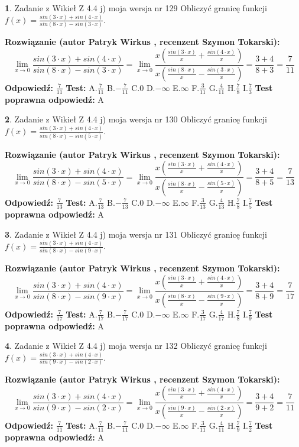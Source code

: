 \documentclass[12pt, a4paper]{article}
\theoremstyle{definition} %
\newtheorem{zad}{}
\newcommand{\zadStart}[1]{\begin{zad}#1\newline}
\newcommand{\zadStop}{\end{zad}}
\newcommand{\rozwStart}[2]{\noindent \textbf{Rozwiązanie (autor #1 , recenzent #2): }\newline}
\newcommand{\rozwStop}{\newline}
\newcommand{\odpStart}{\noindent \textbf{Odpowiedź:}\newline}
\newcommand{\odpStop}{\newline}
\newcommand{\testStart}{\noindent \textbf{Test:}\newline}
\newcommand{\testStop}{\newline}
\newcommand{\kluczStart}{\noindent \textbf{Test poprawna odpowiedź:}\newline}
\newcommand{\kluczStop}{\newline}
\begin{document}
\zadStart{Zadanie z Wikieł Z 4.4 j) moja wersja nr 129}
Obliczyć granicę funkcji $f(x)=\frac{sin(3\cdot x) +sin(4\cdot x)}{sin(8\cdot x) -sin(3\cdot x)}$.
\zadStop
\rozwStart{Patryk Wirkus}{Szymon Tokarski}
$$\lim\limits_{x\to 0}\frac{sin(3\cdot x) +sin(4\cdot x)}{sin(8\cdot x) -sin(3\cdot x)}=\lim\limits_{x\to 0}\frac{x(\frac{sin(3\cdot x)}{x}+\frac{sin(4\cdot x)}{x})}{x(\frac{sin(8\cdot x)}{x}-\frac{sin(3\cdot x)}{x})}=\frac{3+4}{8+3} = \frac{7}{11}$$
\rozwStop
\odpStart
$\frac{7}{11}$
\odpStop
\testStart
A.$\frac{7}{11}$
B.$-\frac{7}{11}$
C.$0$
D.$-\infty$
E.$\infty$
F.$\frac{3}{11}$
G.$\frac{4}{11}$
H.$\frac{7}{8}$
I.$\frac{7}{3}$
\testStop
\kluczStart
A
\kluczStop



\zadStart{Zadanie z Wikieł Z 4.4 j) moja wersja nr 130}
Obliczyć granicę funkcji $f(x)=\frac{sin(3\cdot x) +sin(4\cdot x)}{sin(8\cdot x) -sin(5\cdot x)}$.
\zadStop
\rozwStart{Patryk Wirkus}{Szymon Tokarski}
$$\lim\limits_{x\to 0}\frac{sin(3\cdot x) +sin(4\cdot x)}{sin(8\cdot x) -sin(5\cdot x)}=\lim\limits_{x\to 0}\frac{x(\frac{sin(3\cdot x)}{x}+\frac{sin(4\cdot x)}{x})}{x(\frac{sin(8\cdot x)}{x}-\frac{sin(5\cdot x)}{x})}=\frac{3+4}{8+5} = \frac{7}{13}$$
\rozwStop
\odpStart
$\frac{7}{13}$
\odpStop
\testStart
A.$\frac{7}{13}$
B.$-\frac{7}{13}$
C.$0$
D.$-\infty$
E.$\infty$
F.$\frac{3}{13}$
G.$\frac{4}{13}$
H.$\frac{7}{8}$
I.$\frac{7}{5}$
\testStop
\kluczStart
A
\kluczStop



\zadStart{Zadanie z Wikieł Z 4.4 j) moja wersja nr 131}
Obliczyć granicę funkcji $f(x)=\frac{sin(3\cdot x) +sin(4\cdot x)}{sin(8\cdot x) -sin(9\cdot x)}$.
\zadStop
\rozwStart{Patryk Wirkus}{Szymon Tokarski}
$$\lim\limits_{x\to 0}\frac{sin(3\cdot x) +sin(4\cdot x)}{sin(8\cdot x) -sin(9\cdot x)}=\lim\limits_{x\to 0}\frac{x(\frac{sin(3\cdot x)}{x}+\frac{sin(4\cdot x)}{x})}{x(\frac{sin(8\cdot x)}{x}-\frac{sin(9\cdot x)}{x})}=\frac{3+4}{8+9} = \frac{7}{17}$$
\rozwStop
\odpStart
$\frac{7}{17}$
\odpStop
\testStart
A.$\frac{7}{17}$
B.$-\frac{7}{17}$
C.$0$
D.$-\infty$
E.$\infty$
F.$\frac{3}{17}$
G.$\frac{4}{17}$
H.$\frac{7}{8}$
I.$\frac{7}{9}$
\testStop
\kluczStart
A
\kluczStop



\zadStart{Zadanie z Wikieł Z 4.4 j) moja wersja nr 132}
Obliczyć granicę funkcji $f(x)=\frac{sin(3\cdot x) +sin(4\cdot x)}{sin(9\cdot x) -sin(2\cdot x)}$.
\zadStop
\rozwStart{Patryk Wirkus}{Szymon Tokarski}
$$\lim\limits_{x\to 0}\frac{sin(3\cdot x) +sin(4\cdot x)}{sin(9\cdot x) -sin(2\cdot x)}=\lim\limits_{x\to 0}\frac{x(\frac{sin(3\cdot x)}{x}+\frac{sin(4\cdot x)}{x})}{x(\frac{sin(9\cdot x)}{x}-\frac{sin(2\cdot x)}{x})}=\frac{3+4}{9+2} = \frac{7}{11}$$
\rozwStop
\odpStart
$\frac{7}{11}$
\odpStop
\testStart
A.$\frac{7}{11}$
B.$-\frac{7}{11}$
C.$0$
D.$-\infty$
E.$\infty$
F.$\frac{3}{11}$
G.$\frac{4}{11}$
H.$\frac{7}{9}$
I.$\frac{7}{2}$
\testStop
\kluczStart
A
\kluczStop
\end{document}
